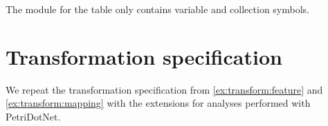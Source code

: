 

The  module for the table only contains variable and collection symbols.



\section{Transformation specification}

We repeat the transformation specification from \vref{ex:transform:feature} and \vref{ex:transform:mapping} with the extensions for analyses performed with PetriDotNet.

